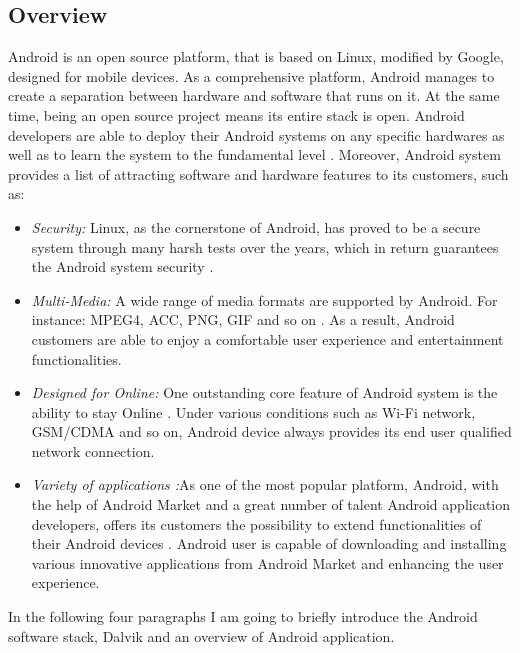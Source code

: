 \subsection{Overview}
Android is an open source platform, that is based on Linux, modified by Google, designed for mobile devices. As a comprehensive platform, Android manages to create a separation between hardware and software that runs on it.  At the same time, being an open source project means its entire stack is open. Android developers are able to deploy their Android systems on any specific hardwares as well as to learn the system to the fundamental level \cite{learn_android}.
Moreover, Android system provides a list of attracting software and hardware features to its customers, such as:
\begin{itemize}
\item \emph{Security:} Linux, as the cornerstone of Android, has proved to be a secure system through many harsh tests over the years, which in return guarantees the Android system security \cite{learn_android}.
\item \emph{Multi-Media:} A wide range of media formats are supported by Android. For instance: MPEG4, ACC, PNG, GIF and so on \cite{android_media}. As a result, Android customers are able to enjoy a comfortable user experience and entertainment functionalities.
\item \emph{Designed for Online:} One outstanding core feature of Android system is the ability to stay Online \cite{android_forensics}. Under various conditions such as Wi-Fi network, GSM/CDMA and so on, Android device always provides its end user qualified network connection.
\item \emph{Variety of applications :}As one of the most popular platform,  Android, with the help of Android Market and a great number of talent Android application developers, offers its customers the possibility to extend  functionalities of their Android devices \cite{android_forensics}. Android user is capable of downloading and installing various innovative applications from Android Market and enhancing the user experience.
\end{itemize}

In the following four paragraphs I am going to briefly introduce the Android software stack, Dalvik and an overview of Android application.

